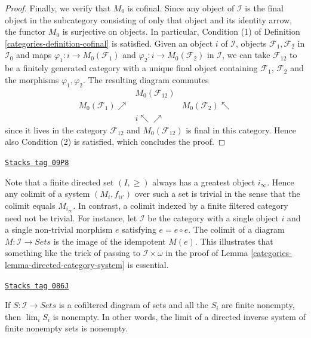 \begin{proof}
\medskip\noindent
Finally, we verify that $M_0$ is cofinal. Since any
object of $\mathcal{I}$ is the final object in the subcategory
consisting of only that object and its identity arrow, the functor
$M_0$ is surjective on objects. In particular, Condition (1) of
Definition \ref{categories-definition-cofinal} is satisfied. Given
an object $i$ of $\mathcal{I}$, objects $\mathcal{F}_1, \mathcal{F}_2$ in
$\mathcal{I}_0$ and maps $\varphi_1 : i \to M_0(\mathcal{F}_1)$
and $\varphi_2 : i \to M_0(\mathcal{F}_2)$ in
$\mathcal{I}$, we can take $\mathcal{F}_{12}$ to be a finitely
generated category with a unique final object containing
$\mathcal{F}_1$, $\mathcal{F}_2$ and the morphisms $\varphi_1, \varphi_2$.
The resulting diagram commutes
$$
\begin{array}{ccc} & M_0(\mathcal{F}_{12}) &  \\ M_0(\mathcal{F}_{1}) \nearrow &  & M_0(\mathcal{F}_{2}) \nwarrow \\  & i \nwarrow\nearrow & \end{array}
$$
since it lives in the category $\mathcal{F}_{12}$ and
$M_0(\mathcal{F}_{12})$ is final in
this category. Hence also Condition (2) is satisfied, which concludes
the proof.
\end{proof}

\begin{remark}
\label{categories-remark-trick-needed}
\href{https://stacks.math.columbia.edu/tag/09P8}{\texttt{Stacks tag 09P8}}

Note that a finite directed set $(I, \geq)$ always has a greatest object
$i_\infty$. Hence any colimit of a system $(M_i, f_{ii'})$ over such a set
is trivial in the sense that the colimit equals $M_{i_\infty}$. In contrast,
a colimit indexed by a finite filtered category need not
be trivial. For instance, let $\mathcal{I}$ be the category with a single object
$i$ and a single non-trivial morphism $e$ satisfying $e = e \circ e$. The
colimit of a diagram $M : \mathcal{I} \to Sets$ is the image of the
idempotent $M(e)$. This illustrates that something like the trick of passing
to $\mathcal{I}\times \omega$ in the proof of
Lemma \ref{categories-lemma-directed-category-system} is essential.
\end{remark}

\begin{lemma}
\label{categories-lemma-nonempty-limit}
\href{https://stacks.math.columbia.edu/tag/086J}{\texttt{Stacks tag 086J}}

If $S : \mathcal{I} \to \textit{Sets}$ is a cofiltered diagram of sets
and all the $S_i$ are finite nonempty, then $\lim_i S_i$ is nonempty.
In other words, the limit of a directed inverse system of finite nonempty sets
is nonempty.
\end{lemma}

